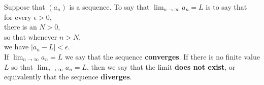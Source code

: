 \documentclass{ximera}
\newcommand{\defnword}[1]{\textbf{#1}}
\renewcommand{\index}[1]{}
\begin{document}
\begin{definition} \relax\index{limit of a sequence}
\label{definition:limit-of-a-sequence}
Suppose that $\left(a_n\right)$ is a sequence.
To say that $\displaystyle\lim_{n\to \infty}a_n=L$ is to say that \\
\null\quad for every $\epsilon>0$, \\
\null\quad\quad there is an $N > 0$, \\
\null\quad so that whenever $n>N$, \\
\null\quad\quad we have $|a_n-L|<\epsilon$. \\
If $\displaystyle\lim_{n\to\infty}a_n=L$ we say that the sequence
\defnword{converges}\index{convergent
  sequence}\index{sequence!convergent}.  If there is no finite value $L$ so
that $\displaystyle\lim_{n\to\infty}a_n = L$, then we say that the limit
\defnword{does not exist}, or equivalently that the sequence
\defnword{diverges}\index{divergent sequence}\index{sequence!divergent}.
\end{definition} 
\end{document}
